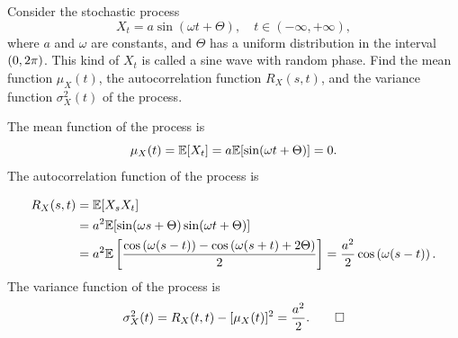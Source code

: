 \begin{example}
  Consider the stochastic process
  \[
    X_t = a \sin(\omega t + \Theta), \quad t \in (-\infty, +\infty),
  \]
  where \(a\) and \(\omega\) are constants, and \(\Theta\) has a uniform distribution in the interval \((0, 2\mathrm{\pi})\). This kind of \(X_t\) is called a sine wave with random phase. Find the mean function \(\mu_X(t)\), the autocorrelation function \(R_X(s, t)\), and the variance function \(\sigma_X^2(t)\) of the process.
\end{example}
\begin{solution}
  The mean function of the process is
  \[
    \mu_X(t) = \mathbb{E}[X_t] = a \mathbb{E}[\sin(\omega t + \Theta)] = 0.
  \]
  The autocorrelation function of the process is
  
  \begin{align*}
    R_X(s, t) &= \mathbb{E}[X_s X_t] \\
    &= a^2 \mathbb{E}[\sin(\omega s + \Theta) \sin(\omega t + \Theta)] \\
    &= a^2 \mathbb{E}\left[\frac{\cos\left(\omega(s - t)\right) - \cos\left(\omega(s + t) + 2\Theta\right)}{2}\right] = \frac{a^2}{2} \cos\left(\omega(s - t)\right).
  \end{align*}
  The variance function of the process is
  \[
    \sigma_X^2(t) = R_X(t, t) - [\mu_X(t)]^2 = \frac{a^2}{2}. \qedhere
  \]
\end{solution}